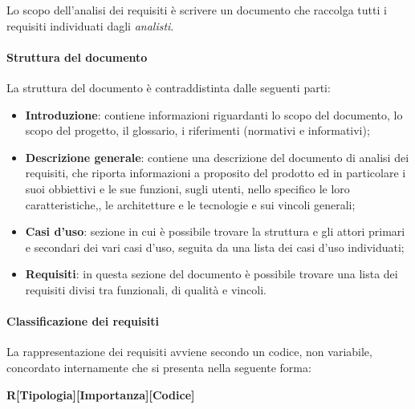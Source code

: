 \documentclass[../norme_di_progetto.tex]{subfiles}
\begin{document}
Lo scopo dell'analisi dei requisiti è scrivere un documento che raccolga tutti i requisiti individuati dagli \emph{analisti}.

\paragraph{Struttura del documento}

La struttura del documento è contraddistinta dalle seguenti parti:
\begin{itemize}
    \item \textbf{Introduzione}: contiene informazioni riguardanti lo scopo del documento, lo scopo del progetto, il glossario, i riferimenti (normativi e informativi);
    \item \textbf{Descrizione generale}: contiene una descrizione del documento di analisi dei requisiti, che riporta informazioni a proposito del prodotto ed in particolare i suoi obbiettivi e le sue funzioni, sugli utenti, nello specifico le loro caratteristiche,, le architetture e le tecnologie e sui vincoli generali;
    \item \textbf{Casi d'uso}: sezione in cui è possibile trovare la struttura e gli attori primari e secondari dei vari casi d'uso, seguita da una lista dei casi d'uso individuati;
    \item \textbf{Requisiti}: in questa sezione del documento è possibile trovare una lista dei requisiti divisi tra funzionali, di qualità e vincoli.
\end{itemize}

\paragraph{Classificazione dei requisiti}
La rappresentazione dei requisiti avviene secondo un codice, non variabile, concordato internamente che si presenta nella seguente forma: \par

\begin{center}
    \textbf{R[Tipologia][Importanza][Codice]}
\end{center}
\end{document}
